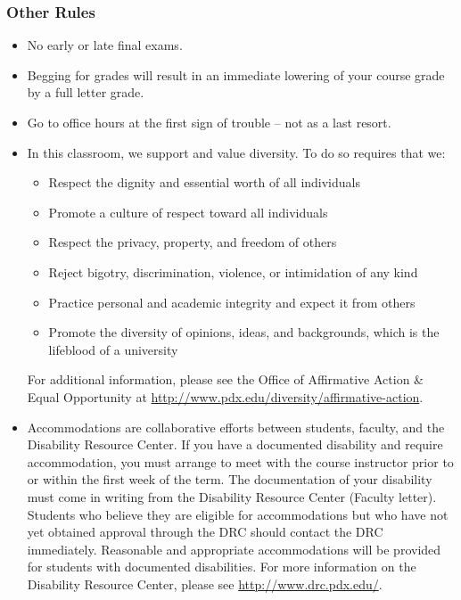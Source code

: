 \documentclass[letterpaper,10pt]{article}
\begin{document}
\subsubsection{Other Rules}
\begin{itemize}

\item No early or late final exams.

\item Begging for grades will result in an immediate lowering of your
  course grade by a full letter grade.

\item Go to office hours at the first sign of trouble -- not as a last
  resort.

\item In this classroom, we support and value diversity.  To do so requires that we:
\begin{itemize}
   \item Respect the dignity and essential worth of all individuals
   \item Promote a culture of respect toward all individuals
    \item Respect the privacy, property, and freedom of others
    \item Reject bigotry, discrimination, violence, or intimidation of any kind
    \item Practice personal and academic integrity and expect it from others
   \item Promote the diversity of opinions, ideas, and backgrounds, which is
    the lifeblood of a university
\end{itemize}

 For additional information, please see the Office of Affirmative Action \& Equal Opportunity at \url{http://www.pdx.edu/diversity/affirmative-action}.


\item Accommodations are collaborative efforts between students, faculty, and the Disability Resource Center.  If you have a documented disability and require accommodation, you must arrange to meet with the course instructor prior to or within the first week of the term.  The documentation of your disability must come in writing from the Disability Resource Center (Faculty letter).  Students who believe they are eligible for accommodations but who have not yet obtained approval through the DRC should contact the DRC immediately.  Reasonable and appropriate accommodations will be provided for students with documented disabilities.  For more information on the Disability Resource Center, please see \url{http://www.drc.pdx.edu/}. 



\end{itemize}
\end{document}
